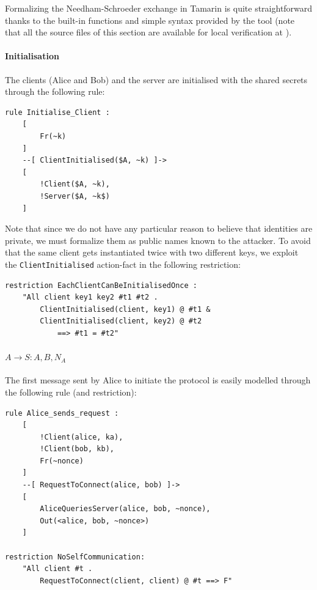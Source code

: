 \documentclass[fleqn,10pt]{SelfArx} %
\begin{document}
Formalizing the Needham-Schroeder exchange in Tamarin is quite straightforward thanks to the built-in functions and simple syntax provided by the tool (note that all the source files of this section are available for local verification at \cite{github}).

\paragraph{Initialisation}

The clients (Alice and Bob) and the server are initialised with the shared secrets through the following rule:

\begin{lstlisting}[language=Tamarin]
rule Initialise_Client :
    [
        Fr(~k)
    ]
    --[ ClientInitialised($A, ~k) ]->
    [
        !Client($A, ~k),
        !Server($A, ~k$)
    ]
\end{lstlisting}

Note that since we do not have any particular reason to believe that identities are private, we must formalize them as public names known to the attacker. To avoid that the same client gets instantiated twice with two different keys, we exploit the \lstinline|ClientInitialised| action-fact in the following restriction:

\begin{lstlisting}[language=Tamarin]
restriction EachClientCanBeInitialisedOnce :
    "All client key1 key2 #t1 #t2 .
        ClientInitialised(client, key1) @ #t1 &
        ClientInitialised(client, key2) @ #t2
            ==> #t1 = #t2"
\end{lstlisting}

\paragraph{$A \to S: A,B,N_A$}

The first message sent by Alice to initiate the protocol is easily modelled through the following rule (and restriction):

\begin{lstlisting}[language=Tamarin]
rule Alice_sends_request :
    [
        !Client(alice, ka),
        !Client(bob, kb),
        Fr(~nonce)
    ]
    --[ RequestToConnect(alice, bob) ]->
    [
        AliceQueriesServer(alice, bob, ~nonce),
        Out(<alice, bob, ~nonce>)
    ]

restriction NoSelfCommunication:
    "All client #t .
        RequestToConnect(client, client) @ #t ==> F"
\end{lstlisting}
\end{document}
